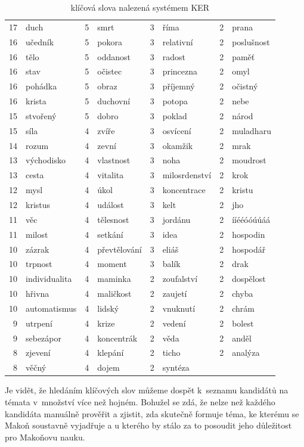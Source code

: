 \begin{table}[htpb]
\begin{center}
\begin{tabular}{|r l|r l|r l|r l|}
17 & duch	 & 5 & smrt	 & 3 & říma	 & 2 & prana	 \\
16 & učedník	 & 5 & pokora	 & 3 & relativní	 & 2 & poslušnost	 \\
16 & tělo	 & 5 & oddanost	 & 3 & radost	 & 2 & paměť	 \\
16 & stav	 & 5 & očistec	 & 3 & princezna	 & 2 & omyl	 \\
16 & pohádka	 & 5 & obraz	 & 3 & příjemný	 & 2 & očistný	 \\
16 & krista	 & 5 & duchovní	 & 3 & potopa	 & 2 & nebe	 \\
15 & stvořený	 & 5 & dobro	 & 3 & poklad	 & 2 & národ	 \\
15 & síla	 & 4 & zvíře	 & 3 & osvícení	 & 2 & muladharu	 \\
14 & rozum	 & 4 & zevní	 & 3 & okamžik	 & 2 & mrak	 \\
13 & východisko	 & 4 & vlastnost	 & 3 & noha	 & 2 & moudrost	 \\
13 & cesta	 & 4 & vitalita	 & 3 & milosrdenství	 & 2 & krok	 \\
12 & mysl	 & 4 & úkol	 & 3 & koncentrace	 & 2 & kristu	 \\
12 & kristus	 & 4 & událost	 & 3 & kelt	 & 2 & jho	 \\
11 & věc	 & 4 & tělesnost	 & 3 & jordánu	 & 2 & ííééóóúúáá	 \\
11 & milost	 & 4 & setkání	 & 3 & idea	 & 2 & hospodin	 \\
10 & zázrak	 & 4 & převtělování	 & 3 & eliáš	 & 2 & hospodář	 \\
10 & trpnost	 & 4 & moment	 & 3 & balík	 & 2 & drak	 \\
10 & individualita	 & 4 & maminka	 & 2 & zoufalství	 & 2 & dospělost	 \\
10 & hřivna	 & 4 & maličkost	 & 2 & zaujetí	 & 2 & chyba	 \\
10 & automatismus	 & 4 & lidský	 & 2 & vnuknutí	 & 2 & chrám	 \\
9 & utrpení	 & 4 & krize	 & 2 & vedení	 & 2 & bolest	 \\
9 & sebezápor	 & 4 & koncentrák	 & 2 & věda	 & 2 & anděl	 \\
8 & zjevení	 & 4 & klepání	 & 2 & ticho	 & 2 & analýza	 \\
8 & věčný	 & 4 & dojem	 & 2 & syntéza	 &   &                  \\
\hline
\end{tabular}
\caption{klíčová slova nalezená systémem KER}\label{tab:ker}
\end{center}
\end{table}

Je vidět, že hledáním klíčových slov můžeme dospět k~seznamu kandidátů na témata
v~množství více než hojném. Bohužel se zdá, že nelze než každého kandidáta
manuálně prověřit a zjistit, zda skutečně formuje téma, ke kterému se Makoň
soustavně vyjadřuje a u kterého by stálo za to posoudit jeho důležitost pro
Makoňovu nauku.




